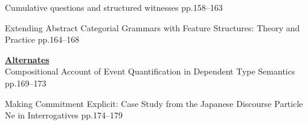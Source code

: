 \documentclass[12pt]{jarticle}
\begin{document}

  
     {Cumulative questions and structured witnesses}
     {pp.158--163}
  
     {Extending Abstract Categorial Grammars with Feature Structures: Theory and Practice}
     {pp.164--168}







\noindent \underline{\textbf{Alternates}}\\

  
     {Compositional Account of Event Quantification in Dependent Type Semantics}
     {pp.169--173}
  
     {Making Commitment Explicit: Case Study from the Japanese Discourse Particle Ne in Interrogatives}
     {pp.174--179}


  
\end{document}
